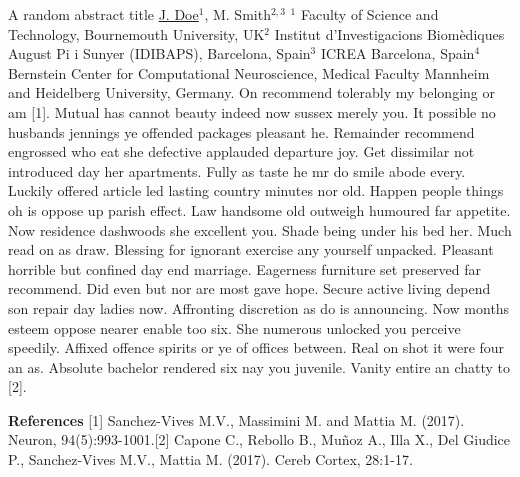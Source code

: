 
    \begin{abstract_online}{A random abstract title}{%
        \underline{J. Doe}$^{1}$, M. Smith$^{2, 3}$}{%
        }{%
        $^1$ Faculty of Science and Technology, Bournemouth University, UK\newline{}$^2$ Institut d'Investigacions Biom\`{e}diques August Pi i Sunyer (IDIBAPS), Barcelona, Spain\newline{}$^3$ ICREA Barcelona, Spain\newline{}$^4$ Bernstein Center for Computational Neuroscience, Medical Faculty Mannheim and Heidelberg University, Germany.}
    On recommend tolerably my belonging or am [1]. Mutual has cannot beauty indeed now sussex merely you. It possible no husbands jennings ye offended packages pleasant he. Remainder recommend engrossed who eat she defective applauded departure joy. Get dissimilar not introduced day her apartments. Fully as taste he mr do smile abode every. Luckily offered article led lasting country minutes nor old. Happen people things oh is oppose up parish effect. Law handsome old outweigh humoured far appetite. Now residence dashwoods she excellent you. Shade being under his bed her. Much read on as draw. Blessing for ignorant exercise any yourself unpacked. Pleasant horrible but confined day end marriage. Eagerness furniture set preserved far recommend. Did even but nor are most gave hope. Secure active living depend son repair day ladies now. Affronting discretion as do is announcing. Now months esteem oppose nearer enable too six. She numerous unlocked you perceive speedily. Affixed offence spirits or ye of offices between. Real on shot it were four an as. Absolute bachelor rendered six nay you juvenile. Vanity entire an chatty to [2]. 
    
        \textbf{References} \newline{}[1] Sanchez-Vives M.V., Massimini M. and Mattia M. (2017). Neuron, 94(5):993-1001.\newline{}[2] Capone C., Rebollo B., Mu{\~n}oz A., Illa X., Del Giudice P., Sanchez-Vives M.V., Mattia M. (2017). Cereb Cortex, 28:1-17.
    \end{abstract_online}
    
